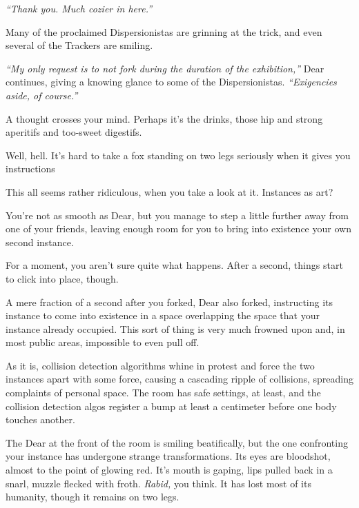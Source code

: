 \emph{``Thank you. Much cozier in here.''}

Many of the proclaimed Dispersionistas are grinning at the trick, and even several of the Trackers are smiling.

\emph{``My only request is to not fork during the duration of the exhibition,''} Dear continues, giving a knowing glance to some of the Dispersionistas. \emph{``Exigencies aside, of course.''}

A thought crosses your mind. Perhaps it's the drinks, those hip and strong aperitifs and too-sweet digestifs.

\vfill

\newpage

\null
\vfill

\noindent Well, hell. It's hard to take a fox standing on two legs seriously when it gives you instructions

\vfill

\newpage
\null
\vfill

\noindent This all seems rather ridiculous, when you take a look at it. Instances as art?
\null
\vfill

\newpage
\null
\vfill

\noindent You're not as smooth as Dear, but you manage to step a little further away from one of your friends, leaving enough room for you to bring into existence your own second instance.
\null
\vfill

\newpage
\null
\vfill

\noindent For a moment, you aren't sure quite what happens. After a second, things start to click into place, though.

A mere fraction of a second after you forked, Dear also forked, instructing its instance to come into existence in a space overlapping the space that your instance already occupied. This sort of thing is very much frowned upon and, in most public areas, impossible to even pull off.

As it is, collision detection algorithms whine in protest and force the two instances apart with some force, causing a cascading ripple of collisions, spreading complaints of personal space. The room has safe settings, at least, and the collision detection algos register a bump at least a centimeter before one body touches another.

The Dear at the front of the room is smiling beatifically, but the one confronting your instance has undergone strange transformations. Its eyes are bloodshot, almost to the point of glowing red. It's mouth is gaping, lips pulled back in a snarl, muzzle flecked with froth. \emph{Rabid,} you think. It has lost most of its humanity, though it remains on two legs.


